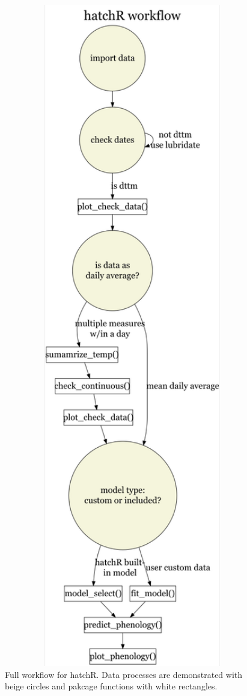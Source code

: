 \documentclass[10pt,a4paper,onecolumn]{article}
\begin{document}
\begin{figure}

{\centering \includegraphics[width=5.68in,height=0.5\textheight]{flowchart} 

}

\caption{Full workflow for hatchR. Data processes are demonstrated with beige circles and pakcage functions with white rectangles.}\label{fig:unnamed-chunk-3}
\end{figure}
\end{document}
